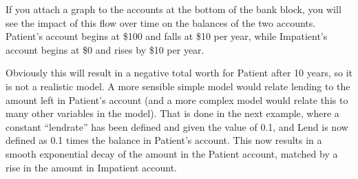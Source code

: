 If you attach a graph to the accounts at the bottom of the bank block,
you will see the impact of this flow over time on the balances of the
two accounts. Patient's account begins at \$100 and falls at \$10 per
year, while Impatient's account begins at \$0 and rises by \$10 per
year.

\begin{center}
\end{center}

Obviously this will result in a negative total worth for Patient after
10 years, so it is not a realistic model. A more sensible simple model
would relate lending to the amount left in Patient's account (and a
more complex model would relate this to many other variables in the
model). That is done in the next example, where a constant ``lendrate''
has been defined and given the value of 0.1, and Lend is now defined
as 0.1 times the balance in Patient's account. This now results in a
smooth exponential decay of the amount in the Patient account, matched
by a rise in the amount in Impatient account.

